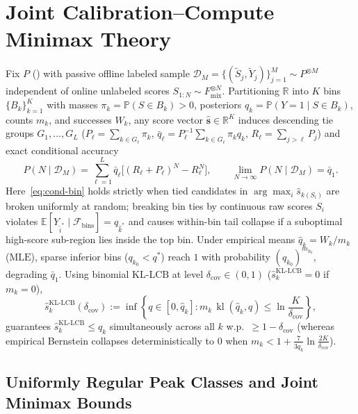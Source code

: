\documentclass{article}
\theoremstyle{plain}
\theoremstyle{definition}
\theoremstyle{remark}
\newcommand{\R}{\mathbb{R}}
\newcommand{\E}{\mathbb{E}}
\newcommand{\Prob}{\mathbb{P}}
\newcommand{\KL}{\operatorname{kl}}
\newcommand{\Fmix}{F_{\mathrm{mix}}}
\begin{document}
\section{Joint Calibration--Compute Minimax Theory}
\label{sec:minimax}

Fix $P$ () with passive offline labeled sample $\mathcal{D}_M = \{(\tilde{S}_j, \tilde{Y}_j)\}_{j=1}^M \sim P^{\otimes M}$ independent of online unlabeled scores $S_{1:N} \sim \Fmix^{\otimes N}$. Partitioning $\R$ into $K$ bins $\{B_k\}_{k=1}^K$ with masses $\pi_k = \Prob(S \in B_k) > 0$, posteriors $q_k = \Prob(Y=1 \mid S \in B_k)$, counts $m_k$, and successes $W_k$, any score vector $\hat{\mathbf{s}} \in \R^K$ induces descending tie groups $G_1, \dots, G_L$ ($P_\ell = \sum_{k\in G_\ell}\pi_k$, $\bar{q}_\ell = P_\ell^{-1}\sum_{k\in G_\ell}\pi_k q_k$, $R_\ell = \sum_{j>\ell} P_j$) and exact conditional accuracy
\begin{equation}
\label{eq:cond-bin}
P(N \mid \mathcal{D}_M) = \sum_{\ell=1}^L \bar{q}_\ell\big[(R_\ell + P_\ell)^N - R_\ell^N\big], \qquad \lim_{N\to\infty} P(N \mid \mathcal{D}_M) = \bar{q}_1.
\end{equation}
Here~\eqref{eq:cond-bin} holds strictly when tied candidates in $\arg\max_i \hat{s}_{k(S_i)}$ are broken uniformly at random; breaking bin ties by continuous raw scores $S_i$ violates $\E[Y_{\hat{i}^*} \mid \mathcal{F}_{\mathrm{bins}}] = q_{\hat{k}^*}$ and causes within-bin tail collapse if a suboptimal high-score sub-region lies inside the top bin. Under empirical means $\hat{q}_k = W_k/m_k$ ($\mathrm{MLE}$), sparse inferior bins ($q_{k_0} < q^*$) reach $1$ with probability $(q_{k_0})^{m_{k_0}}$, degrading $\bar{q}_1$. Using binomial $\mathrm{KL\text{-}LCB}$ \citep{garivier2011kl} at level $\delta_{\mathrm{cov}} \in (0, 1)$ ($\hat{s}_k^{\mathrm{KL\text{-}LCB}} = 0$ if $m_k = 0$),
\begin{equation}
\label{eq:kl-lcb}
\hat{s}_k^{\mathrm{KL\text{-}LCB}}(\delta_{\mathrm{cov}}) := \inf\left\{q \in [0, \hat{q}_k] : m_k\, \KL(\hat{q}_k, q) \le \ln\frac{K}{\delta_{\mathrm{cov}}}\right\},
\end{equation}
guarantees $\hat{s}_k^{\mathrm{KL\text{-}LCB}} \le q_k$ simultaneously across all $k$ w.p.\ $\ge 1 - \delta_{\mathrm{cov}}$ (whereas empirical Bernstein collapses deterministically to $0$ when $m_k < 1 + \frac{7}{3\hat{q}_k}\ln\frac{2K}{\delta_{\mathrm{cov}}}$).

\subsection{Uniformly Regular Peak Classes and Joint Minimax Bounds}
\end{document}
